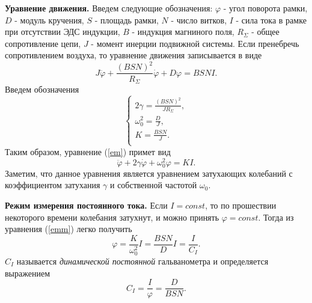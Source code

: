 \documentclass[12pt,a4paper]{article}
\begin{document}
\textbf{Уравнение движения.} Введем следующие обозначения: $\varphi$ - угол поворота рамки, $D$ - модуль кручения, $S$ - площадь рамки, $N$ - число витков, $I$ - сила тока в рамке при отсутствии ЭДС индукции, $B$ - индукция магниного поля, $R_{\Sigma}$ - общее сопротивление цепи, $J$ - момент инерции подвижной системы. Если пренебречь сопротивлением воздуха, то уравнение движения записывается в виде
\begin{equation}
J\ddot\varphi + \frac{(BSN)^2}{R_{\Sigma}}\dot\varphi + D\varphi = BSNI\label{em}.
\end{equation}
Введем обозначения
\begin{equation}
\begin{cases}
2\gamma = \frac{(BSN)^2}{JR_{\Sigma}},\\
\omega_0^2 = \frac{D}{J},\\
K = \frac{BSN}{J}.\\ 
\end{cases}\label{redef}
\end{equation}
Таким образом, уравнение (\ref{em}) примет вид
\begin{equation}
\ddot\varphi + 2\gamma\dot\varphi + \omega_0^2\varphi = KI\label{emm}.
\end{equation}
Заметим, что данное уравнения является уравнением затухающих колебаний с коэффициентом затухания $\gamma$ и собственной частотой $\omega_0$.
\medskip

\textbf{Режим измерения постоянного тока.} Если $I = const$, то по прошествии некоторого времени колебания затухнут, и можно принять $\varphi = const$. Тогда из уравнения (\ref{emm}) легко получить
\begin{equation}
\varphi = \frac{K}{\omega_0^2}I = \frac{BSN}{D}I = \frac{I}{C_I}.
\end{equation}
$C_I$ называется \textit{динамической постоянной} гальванометра и определяется выражением
\begin{equation}
C_I = \frac{I}{\varphi} = \frac{D}{BSN}.\label{dyn}
\end{equation}
\medskip
\end{document}
